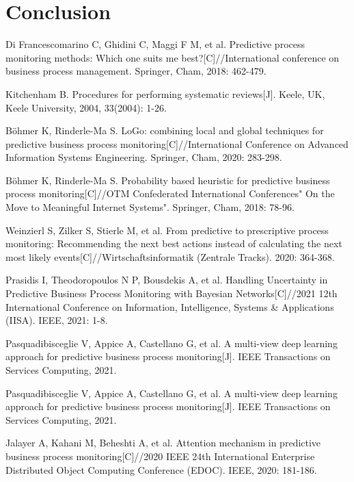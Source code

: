 \documentclass[runningheads]{llncs}
\begin{document}
		
		\section{Conclusion}




		
	\newpage
	\begin{thebibliography}{99}
	
	Di Francescomarino C, Ghidini C, Maggi F M, et al. Predictive process monitoring methods: Which one suits me best?[C]//International conference on business process management. Springer, Cham, 2018: 462-479.
	
	Kitchenham B. Procedures for performing systematic reviews[J]. Keele, UK, Keele University, 2004, 33(2004): 1-26.
	
	Böhmer K, Rinderle-Ma S. LoGo: combining local and global techniques for predictive business process monitoring[C]//International Conference on Advanced Information Systems Engineering. Springer, Cham, 2020: 283-298.
	
	Böhmer K, Rinderle-Ma S. Probability based heuristic for predictive business process monitoring[C]//OTM Confederated International Conferences" On the Move to Meaningful Internet Systems". Springer, Cham, 2018: 78-96.
	
	Weinzierl S, Zilker S, Stierle M, et al. From predictive to prescriptive process monitoring: Recommending the next best actions instead of calculating the next most likely events[C]//Wirtschaftsinformatik (Zentrale Tracks). 2020: 364-368.
	
	Prasidis I, Theodoropoulos N P, Bousdekis A, et al. Handling Uncertainty in Predictive Business Process Monitoring with Bayesian Networks[C]//2021  12th International Conference on Information, Intelligence, Systems \& Applications (IISA). IEEE, 2021: 1-8.
	
	Pasquadibisceglie V, Appice A, Castellano G, et al. A multi-view deep learning approach for predictive business process monitoring[J]. IEEE Transactions on Services Computing, 2021.
	
	Pasquadibisceglie V, Appice A, Castellano G, et al. A multi-view deep learning approach for predictive business process monitoring[J]. IEEE Transactions on Services Computing, 2021.
	
	Jalayer A, Kahani M, Beheshti A, et al. Attention mechanism in predictive business process monitoring[C]//2020 IEEE 24th International Enterprise Distributed Object Computing Conference (EDOC). IEEE, 2020: 181-186.
	

\end{thebibliography}
\end{document}
